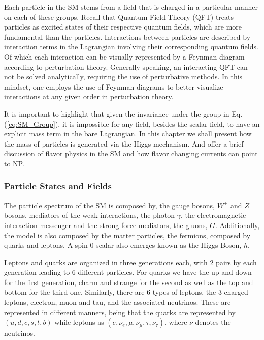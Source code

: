 Each particle in the SM stems from a field that is charged in a particular manner on each of these groups.  
%
Recall that Quantum Field Theory (QFT) treats particles as excited states of their respective quantum fields, which are more fundamental than the particles. 
%
Interactions between particles are described by interaction terms in the Lagrangian involving their corresponding quantum fields.
%
Of which each interaction can be visually represented by a Feynman diagram according to perturbation theory.
%
Generally speaking, an interacting QFT can not be solved analytically, requiring the use of perturbative methods. 
%
In this mindset, one employs the use of Feynman diagrams to better visualize interactions at any given order in perturbation theory.

It is important to highlight that given the invariance under the group in Eq.\,(\ref{eq:SM_Group}), it is impossible for any field, besides the scalar field, to have an explicit mass term in the bare Lagrangian.
%
In this chapter we shall present how the mass of particles is generated via the Higgs mechanism.
%
And offer a brief discussion of flavor physics in the SM and how flavor changing currents can point to NP. 


\subsubsection{Particle States and Fields}

The particle spectrum of the SM is composed by, the gauge bosons, $W^\pm$ and $Z$ bosons, mediators of the weak interactions, the photon $\gamma$, the electromagnetic interaction messenger and the strong force mediators, the gluons, $G$. 
%
Additionally, the model is also composed  by the matter particles, the fermions, composed by quarks and leptons. A spin-0 scalar also emerges known as the Higgs Boson, $h$. 

Leptons and quarks are organized in three generations each, with 2 pairs by each generation leading to 6 different particles. 
%
For quarks we have the up and down for the first generation, charm and strange for the second as well as the top and bottom for the third one. 
%
Similarly, there are 6 types of leptons, the 3 charged leptons, electron, muon and tau, and the associated neutrinos. 
%
These are represented in different manners, being that the quarks are represented by $(u,d,c,s,t,b)$ while leptons as $(e,\nu_{e},\mu,\nu_{\mu},\tau,\nu_{\tau})$, where $\nu$ denotes the neutrinos. 

